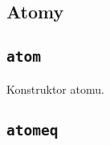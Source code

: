 \subsection{Atomy}
\label{viua_vm_ops_atom}

\subsection{\texttt{atom}}

Konstruktor atomu.

\subsection{\texttt{atomeq}}
